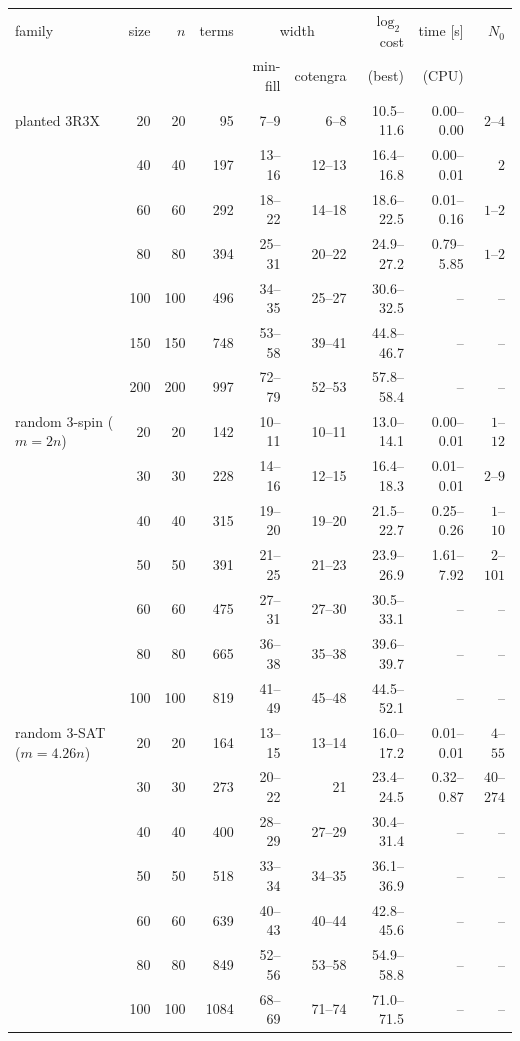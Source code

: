 \begin{tabular}{l rrr rr r rr}
\toprule
family & size & $n$ & terms & \multicolumn{2}{c}{width} & $\log_2$ cost & time [s] & $N_0$ \\
& & & & min-fill & cotengra & (best) & (CPU) & \\
\midrule
planted 3R3X & 20 & 20 & 95 & 7--9 & 6--8 & 10.5--11.6 & 0.00--0.00 & $2$--$4$ \\
 & 40 & 40 & 197 & 13--16 & 12--13 & 16.4--16.8 & 0.00--0.01 & $2$ \\
 & 60 & 60 & 292 & 18--22 & 14--18 & 18.6--22.5 & 0.01--0.16 & $1$--$2$ \\
 & 80 & 80 & 394 & 25--31 & 20--22 & 24.9--27.2 & 0.79--5.85 & $1$--$2$ \\
 & 100 & 100 & 496 & 34--35 & 25--27 & 30.6--32.5 & -- & -- \\
 & 150 & 150 & 748 & 53--58 & 39--41 & 44.8--46.7 & -- & -- \\
 & 200 & 200 & 997 & 72--79 & 52--53 & 57.8--58.4 & -- & -- \\
\addlinespace[2pt]
random 3-spin ($m{=}2n$) & 20 & 20 & 142 & 10--11 & 10--11 & 13.0--14.1 & 0.00--0.01 & $1$--$12$ \\
 & 30 & 30 & 228 & 14--16 & 12--15 & 16.4--18.3 & 0.01--0.01 & $2$--$9$ \\
 & 40 & 40 & 315 & 19--20 & 19--20 & 21.5--22.7 & 0.25--0.26 & $1$--$10$ \\
 & 50 & 50 & 391 & 21--25 & 21--23 & 23.9--26.9 & 1.61--7.92 & $2$--$101$ \\
 & 60 & 60 & 475 & 27--31 & 27--30 & 30.5--33.1 & -- & -- \\
 & 80 & 80 & 665 & 36--38 & 35--38 & 39.6--39.7 & -- & -- \\
 & 100 & 100 & 819 & 41--49 & 45--48 & 44.5--52.1 & -- & -- \\
\addlinespace[2pt]
random 3-SAT ($m{=}4.26n$) & 20 & 20 & 164 & 13--15 & 13--14 & 16.0--17.2 & 0.01--0.01 & $4$--$55$ \\
 & 30 & 30 & 273 & 20--22 & 21 & 23.4--24.5 & 0.32--0.87 & $40$--$274$ \\
 & 40 & 40 & 400 & 28--29 & 27--29 & 30.4--31.4 & -- & -- \\
 & 50 & 50 & 518 & 33--34 & 34--35 & 36.1--36.9 & -- & -- \\
 & 60 & 60 & 639 & 40--43 & 40--44 & 42.8--45.6 & -- & -- \\
 & 80 & 80 & 849 & 52--56 & 53--58 & 54.9--58.8 & -- & -- \\
 & 100 & 100 & 1084 & 68--69 & 71--74 & 71.0--71.5 & -- & -- \\

\end{tabular}
